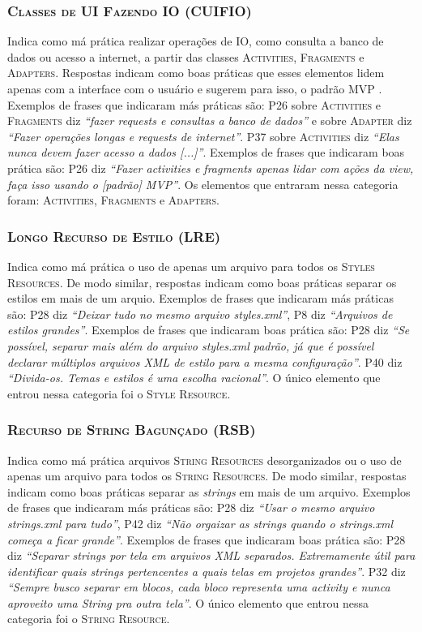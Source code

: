 \subsubsection{\textsc{Classes de UI Fazendo IO (CUIFIO)}}
Indica como má prática realizar operações de IO, como consulta a banco de dados ou acesso a internet, a partir das classes \textsc{Activities}, \textsc{Fragments} e \textsc{Adapters}. Respostas indicam como boas práticas que esses elementos lidem apenas com a interface com o usuário e sugerem para isso, o padrão MVP \cite{WikipediaMVP, MartinFowlerGUIArchitectures}. Exemplos de frases que indicaram más práticas são: P26 sobre \textsc{Activities} e \textsc{Fragments} diz \textit{``fazer requests e consultas a banco de dados''} e sobre \textsc{Adapter} diz \textit{``Fazer operações longas e requests de internet''}. P37 sobre \textsc{Activities} diz \textit{``Elas nunca devem fazer acesso a dados [...]''}. Exemplos de frases que indicaram boas prática são: P26 diz \textit{``Fazer activities e fragments apenas lidar com ações da view, faça isso usando o [padrão] MVP''}. Os elementos que entraram nessa categoria foram: \textsc{Activities}, \textsc{Fragments} e \textsc{Adapters}. 

\subsubsection{\textsc{Longo Recurso de Estilo (LRE)}}
Indica como má prática o uso de apenas um arquivo para todos os \textsc{Styles Resources}. De modo similar, respostas indicam como boas práticas separar os estilos em mais de um arquio. Exemplos de frases que indicaram más práticas são: P28 diz \textit{``Deixar tudo no mesmo arquivo styles.xml''}, P8 diz \textit{``Arquivos de estilos grandes''}. Exemplos de frases que indicaram boas prática são: P28 diz \textit{``Se possível, separar mais além do arquivo styles.xml padrão, já que é possível declarar múltiplos arquivos XML de estilo para a mesma configuração''}. P40 diz \textit{``Divida-os. Temas e estilos é uma escolha racional''}. O único elemento que entrou nessa categoria foi o \textsc{Style Resource}. 

\subsubsection{\textsc{Recurso de String Bagunçado (RSB)}}
Indica como má prática arquivos \textsc{String Resources} desorganizados ou o uso de apenas um arquivo para todos os \textsc{String Resources}. De modo similar, respostas indicam como boas práticas separar as \textit{strings} em mais de um arquivo. Exemplos de frases que indicaram más práticas são: P28 diz \textit{``Usar o mesmo arquivo strings.xml para tudo''}, P42 diz \textit{``Não orgaizar as strings quando o strings.xml começa a ficar grande''}. Exemplos de frases que indicaram boas prática são: P28 diz \textit{``Separar strings por tela em arquivos XML separados. Extremamente útil para identificar quais strings pertencentes a quais telas em projetos grandes''}. P32 diz \textit{``Sempre busco separar em blocos, cada bloco representa uma activity e nunca aproveito uma String pra outra tela''}. O único elemento que entrou nessa categoria foi o \textsc{String Resource}. 


